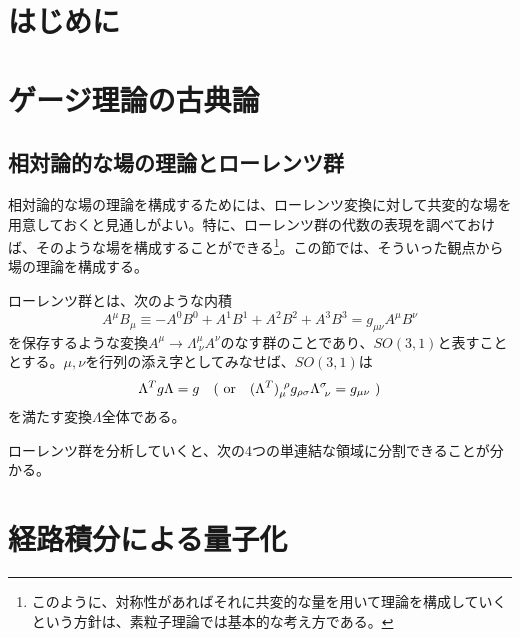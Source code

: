 \documentclass[unicode,a4paper,10pt]{ltjsarticle}
\begin{document}
\maketitle
\tableofcontents

\clearpage
\section{はじめに}




\clearpage
\section{ゲージ理論の古典論}

\subsection{相対論的な場の理論とローレンツ群}

相対論的な場の理論を構成するためには、ローレンツ変換に対して共変的な場を用意しておくと見通しがよい。特に、ローレンツ群の代数の表現を調べておけば、そのような場を構成することができる\footnote{
  このように、対称性があればそれに共変的な量を用いて理論を構成していくという方針は、素粒子理論では基本的な考え方である。
}。この節では、そういった観点から場の理論を構成する。

ローレンツ群とは、次のような内積
\begin{equation}
  A^{\mu}B_{\mu}
  \equiv
  -
  A^{0}B^{0}
  +
  A^{1}B^{1}
  +
  A^{2}B^{2}
  +
  A^{3}B^{3}
  =
  g_{\mu\nu}A^{\mu}B^{\nu}
\end{equation}
を保存するような変換$A^{\mu}\rightarrow\Lambda^{\mu}_{\ \nu}A^{\nu}$のなす群のことであり、$SO(3,1)$と表すこととする。$\mu,\nu$を行列の添え字としてみなせば、$SO(3,1)$は
\begin{equation}
  \Lambda^{T}g\Lambda
  =
  g
  \quad
  (\ \textrm{or\quad}(\Lambda^{T})^{\ \rho}_{\mu}g_{\rho\sigma}\Lambda^{\sigma}_{\ \nu}=g_{\mu\nu}\ )
\end{equation}
を満たす変換$\Lambda$全体である。

ローレンツ群を分析していくと、次の4つの単連結な領域に分割できることが分かる。












\clearpage
\section{経路積分による量子化}
\end{document}
